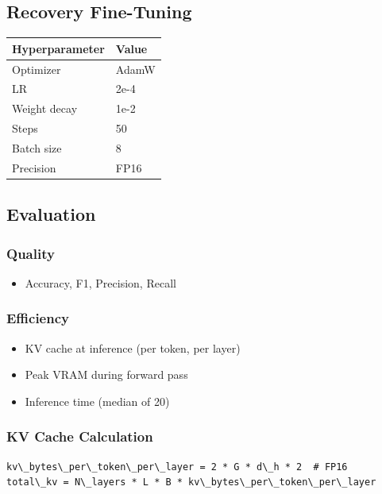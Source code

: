 \subsection{Recovery Fine-Tuning}

\begin{table}[H]
\centering
\small
\begin{tabular}{ll}
\toprule
\textbf{Hyperparameter} & \textbf{Value} \\
\midrule
Optimizer & AdamW \\
LR & 2e-4 \\
Weight decay & 1e-2 \\
Steps & 50 \\
Batch size & 8 \\
Precision & FP16 \\
\bottomrule
\end{tabular}
\end{table}

\subsection{Evaluation}

\subsubsection{Quality}
\begin{itemize}
\item Accuracy, F1, Precision, Recall

\end{itemize}
\subsubsection{Efficiency}
\begin{itemize}
\item KV cache at inference (per token, per layer)
\item Peak VRAM during forward pass
\item Inference time (median of 20)

\end{itemize}
\subsubsection{KV Cache Calculation}

\begin{lstlisting}
kv\_bytes\_per\_token\_per\_layer = 2 * G * d\_h * 2  # FP16
total\_kv = N\_layers * L * B * kv\_bytes\_per\_token\_per\_layer
\end{lstlisting}

